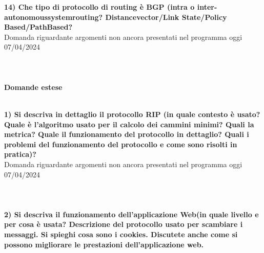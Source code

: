 \documentclass[12pt, letterpaper]{article}
\newcommand{\acc}{\\\hphantom{}\\}
\begin{document}
 \textbf{14) Che tipo di protocollo di routing è BGP (intra o 
 inter-autonomoussystemrouting? Distancevector/Link State/Policy Based/PathBased?}\\
 \color{red}Domanda riguardante argomenti
 non ancora presentati 
 nel programma oggi 07/04/2024\color{black}\acc\hphantom{text}\acc
 \Large  \textbf{Domande estese}\acc
 \normalsize


 \textbf{1) Si descriva in dettaglio il protocollo RIP (in quale contesto è usato? Quale 
 è l'algoritmo usato per il calcolo dei cammini minimi? Quali la metrica? Quale il funzionamento 
 del protocollo in dettaglio? Quali i problemi del funzionamento del protocollo e come sono risolti in pratica)?}\\
 \color{red}Domanda riguardante argomenti
 non ancora presentati 
 nel programma oggi 07/04/2024\color{black}\acc\hphantom{text}\acc


 \textbf{2) Si descriva il funzionamento dell'applicazione Web(in quale livello e per cosa è usata?
  Descrizione del protocollo usato per scambiare i messaggi. Si spieghi cosa sono i cookies. Discutete 
  anche come si possono migliorare le prestazioni dell'applicazione web.}
\end{document}
